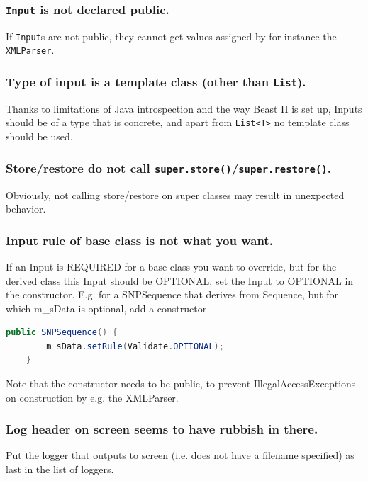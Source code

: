 \documentclass{article}
\begin{document}
\subsubsection{{\tt Input} is not declared public.}

If {\tt Input}s are not public, they cannot get values assigned by for
instance the {\tt XMLParser}.

\subsubsection{Type of input is a template class (other than {\tt List}).}

Thanks to limitations of Java introspection and the way Beast II is set up, Inputs should be 
of a type that is concrete, and apart from {\tt List<T>} no template class should be used.

\subsubsection{Store/restore do not call {\tt super.store()}/{\tt super.restore()}.}

Obviously, not calling store/restore on super classes may result in unexpected behavior.

\subsubsection{Input rule of base class is not what you want.}

If an Input is REQUIRED for a base class you want to override, but for the derived
class this Input should be OPTIONAL, set the Input to OPTIONAL in the constructor.
E.g. for a SNPSequence that derives from Sequence, but for which m\_sData is optional,
add a constructor

{\color{blue}\begin{lstlisting}[language=java]
	public SNPSequence() {
		m_sData.setRule(Validate.OPTIONAL);
	}
\end{lstlisting}}
Note that the constructor needs to be public, to prevent IllegalAccessExceptions
on construction by e.g. the XMLParser.

\subsubsection{Log header on screen seems to have rubbish in there.}

Put the logger that outputs to screen (i.e. does not have a filename specified)
as last in the list of loggers.
\end{document}
